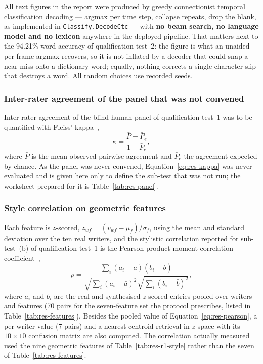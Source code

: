 All text figures in the report were produced by greedy connectionist temporal classification decoding --- argmax per time step, collapse repeats, drop the blank, as implemented in \texttt{Classify.DecodeCtc} --- with \textbf{no beam search, no language model and no lexicon} anywhere in the deployed pipeline.
That matters next to the 94.21\% word accuracy of qualification test~2: the figure is what an unaided per-frame argmax recovers, so it is not inflated by a decoder that could snap a near-miss onto a dictionary word; equally, nothing corrects a single-character slip that destroys a word.
All random choices use recorded seeds.

\subsubsection{Inter-rater agreement of the panel that was not convened}

Inter-rater agreement of the blind human panel of qualification test~1 was to be quantified with Fleiss' kappa~\cite{fleiss1971},
\begin{equation}
\label{eq:res-kappa}
\kappa=\frac{\bar P-\bar P_e}{1-\bar P_e},
\end{equation}
where $\bar P$ is the mean observed pairwise agreement and $\bar P_e$ the agreement expected by chance.
As the panel was never convened, Equation~\ref{eq:res-kappa} was never evaluated and is given here only to define the sub-test that was not run; the worksheet prepared for it is Table~\ref{tab:res-panel}.

\subsubsection{Style correlation on geometric features}

Each feature is $z$-scored, $z_{wf}=(v_{wf}-\mu_f)/\sigma_f$, using the mean and standard deviation over the ten real writers, and the stylistic correlation reported for sub-test~(b) of qualification test~1 is the Pearson product-moment correlation coefficient~\cite{pearson1896},
\begin{equation}
\label{eq:res-pearson}
\rho=\frac{\sum_{i}(a_i-\bar a)(b_i-\bar b)}{\sqrt{\sum_i(a_i-\bar a)^2}\sqrt{\sum_i(b_i-\bar b)^2}},
\end{equation}
where $a_i$ and $b_i$ are the real and synthesised $z$-scored entries pooled over writers and features (70 pairs for the seven-feature set the protocol prescribes, listed in Table~\ref{tab:res-features}).
Besides the pooled value of Equation~\ref{eq:res-pearson}, a per-writer value (7 pairs) and a nearest-centroid retrieval in $z$-space with its $10\times10$ confusion matrix are also computed.
The correlation actually measured used the nine geometric features of Table~\ref{tab:res-r1-style} rather than the seven of Table~\ref{tab:res-features}.

